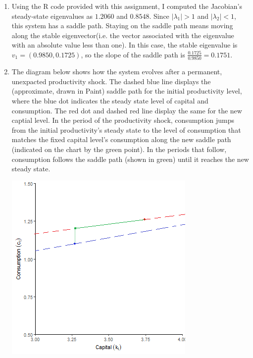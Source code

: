 \documentclass{article}
\newcommand*\colvec[1]{
        \global\colveccount#1
        \begin{pmatrix}
        \colvecnext
}
\def\colvecnext#1{
        #1
        \global\advance\colveccount-1
        \ifnum\colveccount>0
                \\
                \expandafter\colvecnext
        \else
                \end{pmatrix}
        \fi
}
\begin{document}
\begin{enumerate}
\begin{enumerate}
			\item Define:
				\[
					\colvec{2}{\widetilde{k}_{t+1}}{\widetilde{c}_{t+1}} = J\colvec{2}{\widetilde{k}_{t}}{\widetilde{c}_{t}}
					=J\colvec{2}{k_t-\overline{k}}{c_t-\overline{c}}
				\]
		\end{enumerate}
		
	\item Using the R code provided with this assignment, I computed the Jacobian's steady-state eigenvalues as $1.2060$ and $0.8548$. Since $|\lambda_1|>1$ and $|\lambda_2|<1$, this system has a saddle path. Staying on the saddle path means moving along the stable eigenvector(i.e. the vector associated with the eigenvalue with an absolute value less than one). In this case, the stable eigenvalue is $v_1=(0.9850,0.1725)$, so the slope of the saddle path is $\frac{0.1725}{0.9850}=0.1751$.
	
	\item The diagram below shows how the system evolves after a permanent, unexpacted productivity shock. The dashed blue line displays the (approximate, drawn in Paint) saddle path for the initial productivity level, where the blue dot indicates the steady state level of capital and consumption. The red dot and dashed red line display the same for the new captial level. In the period of the productivity shock, consumption jumps from the initial productivity's steady state to the level of consumption that matches the fixed capital level's consumption along the new saddle path (indicated on the chart by the green point). In the periods that follow, consumption follows the saddle path (shown in green) until it reaches the new steady state.
		\begin{center}
			\includegraphics[scale=1]{problem1_phaseplot_edited.png}
		\end{center}
		

\end{enumerate}
\end{document}
